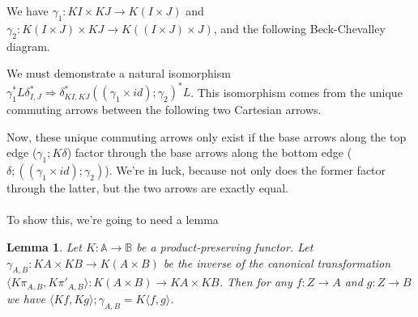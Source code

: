 \documentclass{article}
\newtheorem{lemma}{Lemma}
\begin{document}
We have $\gamma_1 : KI \times KJ \to K(I \times J)$ and $\gamma_2 : K(I \times J) \times KJ \to K((I \times J) \times J)$, and the following Beck-Chevalley diagram.
\begin{center}
\end{center}
We must demonstrate a natural isomorphism $\gamma_1^*L\delta_{I,J}^* \Rightarrow \delta_{KI,KJ}^*((\gamma_1 \times id);\gamma_2)^*L$. This isomorphism comes from the unique 
commuting arrows between the following two Cartesian arrows.
\begin{center}
\end{center}
Now, these unique commuting arrows only exist if the base arrows along the top edge ($\gamma_1;K\delta$) factor through the base arrows along the bottom edge ($\delta;((\gamma_1 \times id);\gamma_2)$). We're in luck, because not only does the former 
factor through the latter, but the two arrows are exactly equal.\\~\\
To show this, we're going to need a lemma
\begin{lemma}
Let $K : \mathbb A \to \mathbb B$ be a product-preserving functor. Let $\gamma_{A,B} : KA \times KB \to K(A \times B)$ be 
the inverse of the canonical transformation $\langle K\pi_{A,B}, K\pi'_{A,B} \rangle : K(A \times B) \to KA \times KB$.
Then for any $f : Z \to A$ and $g : Z \to B$ we have $\langle Kf, Kg \rangle;\gamma_{A,B} = K\langle f, g \rangle$.
\end{lemma}
\end{document}
